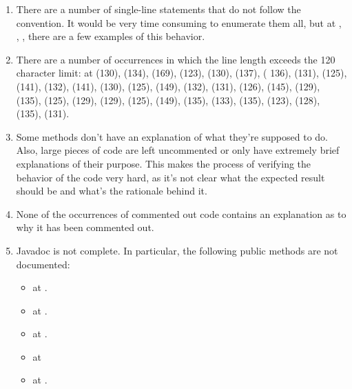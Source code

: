 \begin{enumerate}
	\item {} There are a number of single-line  statements that do not follow the convention. It would be very time consuming to enumerate them all, but at , , ,  there are a few examples of this behavior. 
	\item {} There are a number of occurrences in which the line length exceeds the 120 character limit: at  (130),  (134),  (169), (123),  (130),  (137), ( 136),  (131),  (125),  (141),  (132),  (141),  (130),  (125),  (149),  (132),  (131),  (126),  (145),  (129),  (135),  (125),  (129),  (129),  (125),  (149),  (135),  (133),  (135),  (123),  (128),  (135),  (131).
	\item {} Some methods don't have an explanation of what they're supposed to do. Also, large pieces of code are left uncommented or only have extremely brief explanations of their purpose. This makes the process of verifying the behavior of the code very hard, as it's not clear what the expected result should be and what's the rationale behind it. 
	\item {} None of the occurrences of commented out code contains an explanation as to why it has been commented out. 
	\item {} Javadoc is not complete. In particular, the following public methods are not documented: 
		\begin{itemize}
		\item {} at .
		\item {} at .
		\item {} at .
		\item {} at 
		\item {} at .

\end{itemize}
\end{enumerate}
